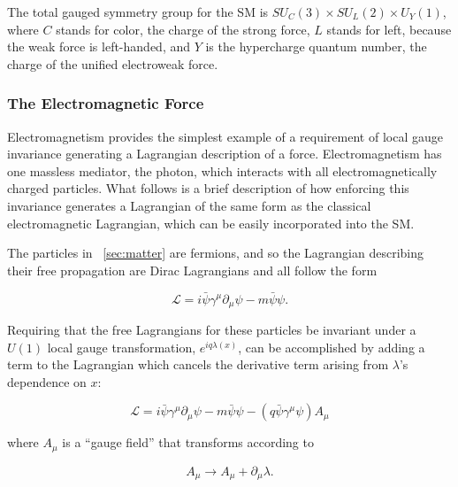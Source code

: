 The total gauged symmetry group for the \ac{SM} is $SU_C(3) \times SU_L(2) \times U_Y(1)$, where $C$ stands for color, the charge of the strong force, $L$ stands for left, because the weak force is left-handed, and $Y$ is the hypercharge quantum number, the charge of the unified electroweak force. 



\subsubsection{The Electromagnetic Force}
\label{sec:em}

Electromagnetism provides the simplest example of a requirement of local gauge invariance generating a Lagrangian description of a force.
Electromagnetism has one massless mediator, the photon, which interacts with all electromagnetically charged particles. What follows is a brief description of how enforcing this invariance generates a Lagrangian of the same form as the classical electromagnetic Lagrangian, which can be easily incorporated into the \ac{SM}. 

The particles in ~\autoref{sec:matter} are fermions, and so the Lagrangian describing their free propagation are Dirac Lagrangians and all follow the form

\begin{equation}
\mathcal{L} = i\bar{\psi}\gamma^\mu \partial_\mu\psi - m \bar{\psi}\psi . 
\end{equation}

Requiring that the free Lagrangians for these particles be invariant under a $U(1)$ local gauge transformation, $e^{iq\lambda(x)}$, can be accomplished by adding a term to the Lagrangian which cancels the derivative term arising from $\lambda$'s dependence on $x$: 

\begin{equation}
\mathcal{L} = i\bar{\psi}\gamma^\mu \partial_\mu\psi - m \bar{\psi}\psi - (q\bar{\psi}\gamma^\mu\psi)A_\mu
\end{equation}

where $A_\mu$ is a ``gauge field'' that transforms according to 

\begin{equation}
A_\mu \rightarrow A_\mu + \partial_\mu \lambda . 
\end{equation}

